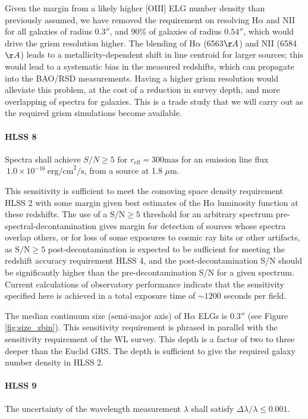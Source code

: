  Given the margin from a likely higher [OIII] ELG number density than previously
 assumed, we have removed the requirement on resolving H$\alpha$ and NII for all
 galaxies of radius $0.3''$, and 90\% of galaxies of radius $0.54''$, which would drive
 the grism resolution higher. The blending of H$\alpha$ (6563$\AA$) and NII (6584$\AA$) leads to
 a metallicity-dependent shift in line centroid for larger sources;
 this would lead to a systematic bias in the measured redshifts, which can
 propagate into the BAO/RSD measurements. Having a higher grism resolution would
 alleviate this problem, at the cost of a reduction in survey depth, and more
 overlapping of spectra for galaxies. This is a trade study that we will carry out
 as the required grism simulations become available.

 \paragraph{HLSS 8} Spectra shall achieve $S/N \geq 5$ for $r_\mathrm{eff} = 300
 \mathrm{mas}$ for an emission line flux $~ 1.0\times10^{-16}\ \mathrm{erg/cm}^2\mathrm{/s}$, from a source at 1.8 $\mu$m.

 This sensitivity is sufficient to meet the comoving space density requirement
 HLSS 2 with some margin given best estimates of the H$\alpha$ luminosity function
 \citep{Pozzetti:2016} at these redshifts. The use of a $\mathrm{S/N} \geq 5$ threshold for an arbitrary spectrum pre-spectral-decontamination gives margin for detection of sources whose spectra overlap others, or for loss of some exposures to cosmic ray hits or other artifacts, as $\mathrm{S/N} \geq 5$ post-decontamination is expected to be
 sufficient for meeting the redshift accuracy requirement HLSS 4, and the
 post-decontamination S/N should be significantly higher than the
 pre-decontamination S/N for a given spectrum. Current calculations of
 observatory performance indicate that the sensitivity specified here is achieved
 in a total exposure time of  $\sim1200$ seconds per field.

 The median continuum size (semi-major axis) of H$\alpha$ ELGs is $0.3''$ (see Figure \ref{fig:size_zbin}).
 This sensitivity requirement is phrased in parallel with the sensitivity requirement
 of the WL survey. This depth is a factor of two to three deeper than the Euclid
 GRS. The depth is sufficient to give the required galaxy number density in HLSS 2.

\paragraph{HLSS 9} The uncertainty of the wavelength measurement $\lambda$ shall satisfy $\Delta\lambda/\lambda \leq 0.001$.

